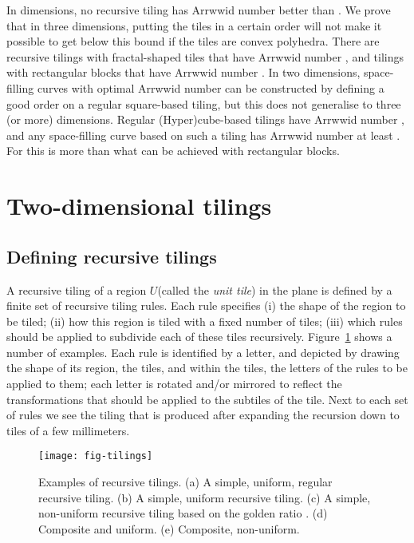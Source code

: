 \documentclass[11pt,a4paper]{article}
\newcommand{\unittile}{\ensuremath{U}\xspace}
\begin{document}
In  dimensions, no recursive tiling has Arrwwid number better than . We prove that in three dimensions, putting the tiles in a certain order will not make it possible to get below this bound if the tiles are convex polyhedra. There are recursive tilings with fractal-shaped tiles that have Arrwwid number , and tilings with rectangular blocks that have Arrwwid number . In two dimensions, space-filling curves with optimal Arrwwid number can be constructed by defining a good order on a regular square-based tiling, but this does not generalise to three (or more) dimensions. Regular (Hyper)cube-based tilings have Arrwwid number , and any space-filling curve based on such a tiling has Arrwwid number at least . For  this is more than what can be achieved with rectangular blocks.

\section{Two-dimensional tilings}

\subsection{Defining recursive tilings}
A recursive tiling of a region \unittile (called the \emph{unit tile}) in the plane is defined by a finite set of recursive tiling rules. Each rule specifies (i) the shape of the region to be tiled; (ii) how this region is tiled with a fixed number of tiles; (iii) which rules should be applied to subdivide each of these tiles recursively. Figure~\ref{fig:tilings} shows a number of examples. Each rule is identified by a letter, and depicted by drawing the shape of its region, the tiles, and within the tiles, the letters of the rules to be applied to them; each letter is rotated and/or mirrored to reflect the transformations that should be applied to the subtiles of the tile. Next to each set of rules we see the tiling that is produced after expanding the recursion down to tiles of a few millimeters.

\begin{figure}
\centering
\texttt{[image: fig-tilings]}
\caption{Examples of recursive tilings. (a) A simple, uniform, regular recursive tiling. (b) A simple, uniform recursive tiling. (c) A simple, non-uniform recursive tiling based on the golden ratio . (d) Composite and uniform. (e) Composite, non-uniform.}
\label{fig:tilings}
\end{figure}
\end{document}
